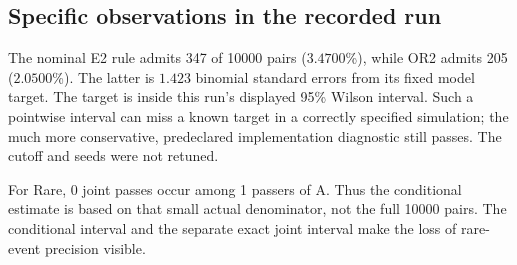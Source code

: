 \subsection{Specific observations in the recorded run}
The nominal E2 rule admits 347 of 10000 pairs ($3.4700$\%), while OR2 admits 205 ($2.0500$\%). The latter is $1.423$ binomial standard errors from its fixed model target. The target is inside this run's displayed 95\% Wilson interval. Such a pointwise interval can miss a known target in a correctly specified simulation; the much more conservative, predeclared implementation diagnostic still passes. The cutoff and seeds were not retuned.

For Rare, 0 joint passes occur among 1 passers of A. Thus the conditional estimate is based on that small actual denominator, not the full 10000 pairs. The conditional interval and the separate exact joint interval make the loss of rare-event precision visible.
